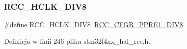 \subsubsection{\texorpdfstring{R\+C\+C\+\_\+\+H\+C\+L\+K\+\_\+\+D\+I\+V8}{RCC\_HCLK\_DIV8}}
{\footnotesize\ttfamily \#define R\+C\+C\+\_\+\+H\+C\+L\+K\+\_\+\+D\+I\+V8~\hyperlink{group___peripheral___registers___bits___definition_ga9ddd6d657837e1971bb86e3bf1c15e72}{R\+C\+C\+\_\+\+C\+F\+G\+R\+\_\+\+P\+P\+R\+E1\+\_\+\+D\+I\+V8}}



Definicja w linii 246 pliku stm32f4xx\+\_\+hal\+\_\+rcc.\+h.

